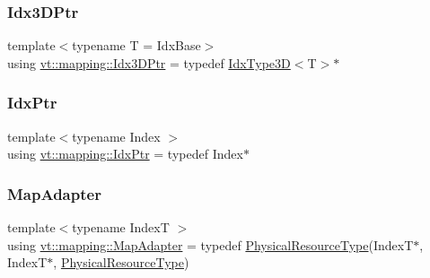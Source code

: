 \mbox{\label{namespacevt_1_1mapping_aacc737158b6517f2d760ffc8d1b5abca}} 
\subsubsection{\texorpdfstring{Idx3\+D\+Ptr}{Idx3DPtr}}
{\footnotesize\ttfamily template$<$typename T  = Idx\+Base$>$ \\
using \hyperlink{namespacevt_1_1mapping_aacc737158b6517f2d760ffc8d1b5abca}{vt\+::mapping\+::\+Idx3\+D\+Ptr} = typedef \hyperlink{namespacevt_a65e4a83c0567ecb7a54b78e9b8e7d7ab}{Idx\+Type3D}$<$T$>$$\ast$}

\mbox{\label{namespacevt_1_1mapping_a1bcab0d331bff853fe09c964d5e9cc8c}} 
\subsubsection{\texorpdfstring{Idx\+Ptr}{IdxPtr}}
{\footnotesize\ttfamily template$<$typename Index $>$ \\
using \hyperlink{namespacevt_1_1mapping_a1bcab0d331bff853fe09c964d5e9cc8c}{vt\+::mapping\+::\+Idx\+Ptr} = typedef Index$\ast$}

\mbox{\label{namespacevt_1_1mapping_a41b113c28bb6430fbcb5be66e08ccf9f}} 
\subsubsection{\texorpdfstring{Map\+Adapter}{MapAdapter}}
{\footnotesize\ttfamily template$<$typename IndexT $>$ \\
using \hyperlink{namespacevt_1_1mapping_a41b113c28bb6430fbcb5be66e08ccf9f}{vt\+::mapping\+::\+Map\+Adapter} = typedef \hyperlink{namespacevt_a2dc36fcada816dc6d11774d650328ee9}{Physical\+Resource\+Type}(IndexT$\ast$, IndexT$\ast$, \hyperlink{namespacevt_a2dc36fcada816dc6d11774d650328ee9}{Physical\+Resource\+Type})}

\mbox{\label{namespacevt_1_1mapping_a443f8bb8920af5ae1d3391f61fe492a6}} 
